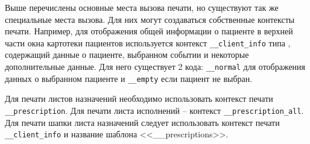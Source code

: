 Выше перечислены основные места вызова печати, но существуют так же специальные места вызова. Для них могут создаваться собственные контексты печати. Например, для отображения общей информации о пациенте в верхней части окна картотеки пациентов используется контекст \verb|__client_info| типа , содержащий данные о пациенте, выбранном событии и некоторые дополнительные данные. Для него существует 2 кода: \verb|__normal| для отображения данных о выбранном пациенте и \verb|__empty| если пациент не выбран.

Для печати листов назначений необходимо использовать контекст печати \verb|__prescription|. Для печати листа исполнений – контекст \verb|__prescription_all|. Для печати шапки листа назначений следует использовать контекст печати \verb|__client_info| и название шаблона <<\_\_prescriptions>>.

